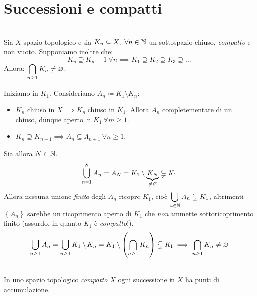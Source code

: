 \section{Successioni e compatti}
\begin{proposition}~{}\label{compattocontenuto}\\
Sia $X$ spazio topologico e sia $K_n\subseteq X,\ \forall n\in\naturalset$ un sottospazio chiuso, \textit{compatto} e non vuoto. Supponiamo inoltre che:
\begin{equation*}
K_n\supseteq K_n+1\ \forall n\implies K_1\supseteq K_2\supseteq K_3\supseteq \ldots
\end{equation*}
Allora: $\displaystyle\mathop{{\bigcap}}\displaylimits_{n\geq 1}K_n\neq\varnothing$.
\end{proposition}
\begin{demonstration}
Iniziamo in $K_1$. Consideriamo $A_n\coloneqq K_1\setminus K_n$:
\begin{itemize}
	\item $K_n$ chiuso in $X\implies K_n$ chiuso in $K_1$. Allora $A_n$ completementare di un chiuso, dunque aperto in $K_1\ \forall m\geq 1$.
	\item $K_n\supseteq K_{n+1}\implies A_n\subseteq A_{n+1}\ \forall n\geq 1$.
\end{itemize}
Sia allora $N\in\mathbb{N}$.
\begin{equation*}
	\mathop{{\bigcup}}\displaylimits_{n=1}^{N}A_n=A_N=K_1\setminus \underbrace{K_N}_{\neq\varnothing}\subsetneqq K_1
\end{equation*}
Allora nessuna unione \textit{finita} degli $A_n$ ricopre $K_1$, cioè $\displaystyle \mathop{{\bigcup}}\displaylimits_{n\in\mathbb{N}}A_n\subsetneqq K_1$, altrimenti $\left\{A_n\right\}$ sarebbe un ricoprimento aperto di $K_1$ che \textit{non} ammette sottoricoprimento finito (assurdo, in quanto $K_1$ è \textit{compatto}!).
\begin{equation*}
\mathop{{\bigcup}}\displaylimits_{n\geq 1}A_n=\mathop{{\bigcup}}\displaylimits_{n\geq 1}K_1\setminus K_n=K_1\setminus \left(\mathop{{\bigcap}}\displaylimits_{n\geq 1}K_n\right)\subsetneqq K_1\implies \mathop{{\bigcap}}\displaylimits_{n\geq 1}K_n\neq\varnothing
\end{equation*}
\vspace{-6mm}
\end{demonstration}
\begin{lemming}~{}\\
In uno spazio topologico \textit{compatto} $X$ ogni successione in $X$ ha punti di accumulazione.
\end{lemming}
